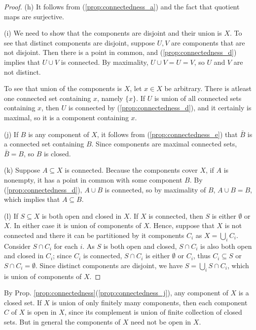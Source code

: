 \documentclass[11pt,a4paper]{article}
\begin{document}
\begin{proof}
\noindent (h) It follows from (\ref{prop:connectedness_a}) and the fact that quotient maps are surjective.

\noindent (i) We need to show that the components are disjoint and their union is $X$. To see that distinct components are disjoint, suppose $U, V$ are components that are not disjoint. Then there is a point in common, and (\ref{prop:connectedness_d}) implies that $U\cup V$ is connected. By maximality, $U\cup V = U = V$, so $U$ and $V$ are not distinct.

To see that union of the components is $X$, let $x\in X$ be arbitrary. There is atleast one connected set containing $x$, namely $\{x\}$. If $U$ is union of all connected sets containing $x$, then $U$ is connected by (\ref{prop:connectedness_d}), and it certainly is maximal, so it is a component containing $x$.

\noindent (j) If $B$ is any component of $X$, it follows from (\ref{prop:connectedness_e}) that $\bar{B}$ is a connected set containing $B$. Since components are maximal connected sets, $\bar{B} = B$, so $B$ is closed.

\noindent (k) Suppose $A\subseteq X$ is connected. Because the components cover $X$, if $A$ is nonempty, it has a point in common with some component $B$. By (\ref{prop:connectedness_d}), $A\cup B$ is connected, so by maximality of $B$, $A\cup B = B$, which implies that $A\subseteq B$.

\noindent (l) If $S\subseteq X$ is both open and closed in $X$. If $X$ is connected, then $S$ is either $\emptyset$ or $X$. In either case it is union of components of $X$. Hence, suppose that $X$ is not connected and there it can be partitioned by it components $C_i$ as $X = \bigcup_i C_i$. Consider $S\cap C_i$ for each $i$. As $S$ is both open and closed, $S\cap C_i$ is also both open and closed in $C_i$; since $C_i$ is connected, $S\cap C_i$ is either $\emptyset$ or $C_i$, thus $C_i\subseteq S$ or $S\cap C_i=\emptyset$. Since distinct components are disjoint, we have $S = \bigcup_i S\cap C_i$, which is union of components of $X$.
\end{proof}

\begin{remark}
By Prop. \ref{prop:connectedness}(\ref{prop:connectedness_j}), any component of $X$ is a closed set. If $X$ is union of only finitely many components, then each component $C$ of $X$ is open in $X$, since its complement is union of finite collection of closed sets. But in general the components of $X$ need not be open in $X$.
\end{remark}
\end{document}
